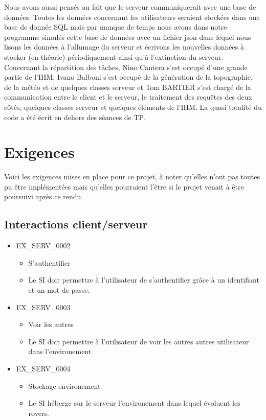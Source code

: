 \documentclass[12pt,a4paper]{scrartcl}
\begin{document}
Nous avons aussi pensés au fait que le serveur communiquerait avec une base de données. Toutes les données concernant les utilisateurs seraient stockées dans une base de donnée SQL
mais par manque de temps nous avons dans notre programme simulés cette base de données avec un fichier json dans lequel nous lisons les données à l'allumage du serveur et écrivons les nouvelles
données à stocker (en théorie) périodiquement ainsi qu'à l'extinction du serveur.\\
Concernant la répartition des tâches, Nino Cantera s'est occupé d'une grande partie de l'IHM, Ivano Balboni s'est occupé de la génération de la topographie, de la météo et de quelques
classes serveur et Tom BARTIER s'est chargé de la communication entre le client et le serveur, le traitement des requêtes des deux côtés, quelques classes serveur et quelques éléments de l'IHM.
La quasi totalité du code a été écrit en dehors des séances de TP.


\section{Exigences}
Voici les exigences mises en place pour ce projet, à noter qu'elles n'ont pas toutes pu être implémentées
mais qu'elles pourraient l'être si le projet venait à être poursuivi après ce rendu.

\subsection{Interactions client/serveur}

\begin{itemize}

\item EX\_SERV\_0002
\begin{itemize}
\item S'authentifier
\item Le SI doit permettre à l'utilisateur de s'authentifier grâce à un
		identifiant et un mot de passe.
\end{itemize}


\item EX\_SERV\_0003
\begin{itemize}
\item Voir les autres
\item Le SI doit permettre à l'utilisateur de voir les autres autres
	utilisateur dans l'environement
\end{itemize}

\item EX\_SERV\_0004
\begin{itemize}
\item Stockage environement
\item Le SI héberge sur le serveur l'environement dans lequel évoluent les
	rovers.
\end{itemize}


\end{itemize}
\end{document}

